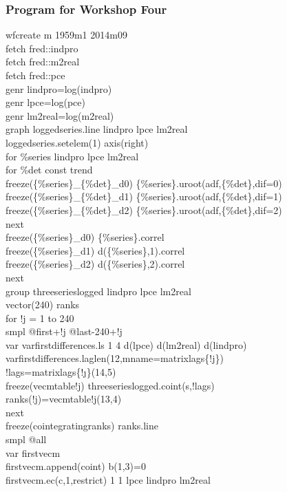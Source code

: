 \documentclass[a4paper,11pt]{article}
\begin{document}
\subsubsection*{Program for Workshop Four}
\noindent wfcreate m 1959m1 2014m09\\
fetch fred::indpro\\
fetch fred::m2real\\
fetch fred::pce\\
genr lindpro=log(indpro)\\
genr lpce=log(pce)\\
genr lm2real=log(m2real)\\
graph loggedseries.line lindpro lpce lm2real\\
loggedseries.setelem(1) axis(right)\\
for \%series lindpro lpce lm2real\\
\indent	for \%det const trend\\
\indent \indent		freeze(\{\%series\}\_\{\%det\}\_d0) \{\%series\}.uroot(adf,\{\%det\},dif=0)\\
\indent \indent		freeze(\{\%series\}\_\{\%det\}\_d1) \{\%series\}.uroot(adf,\{\%det\},dif=1)\\
\indent \indent		freeze(\{\%series\}\_\{\%det\}\_d2) \{\%series\}.uroot(adf,\{\%det\},dif=2)\\
\indent	next\\
\indent	freeze(\{\%series\}\_d0) \{\%series\}.correl\\
\indent	freeze(\{\%series\}\_d1) d(\{\%series\},1).correl\\
\indent	freeze(\{\%series\}\_d2) d(\{\%series\},2).correl\\
next\\
group threeserieslogged lindpro lpce lm2real\\
vector(240) ranks\\
for !j = 1 to 240\\
\indent	smpl @first+!j @last-240+!j\\
\indent	var varfirstdifferences.ls 1 4 d(lpce) d(lm2real) d(lindpro)\\
\indent	varfirstdifferences.laglen(12,mname=matrixlags\{!j\})\\
\indent	!lags=matrixlags\{!\j\}(14,5)\\
\indent	freeze(vecmtable!j) threeserieslogged.coint(s,!lags)\\
\indent	ranks(!j)=vecmtable!j(13,4)\\
next\\
freeze(cointegratingranks) ranks.line\\
smpl @all\\
var firstvecm\\
firstvecm.append(coint) b(1,3)=0\\
firstvecm.ec(c,1,restrict) 1 1 lpce lindpro lm2real\\
\end{document}
